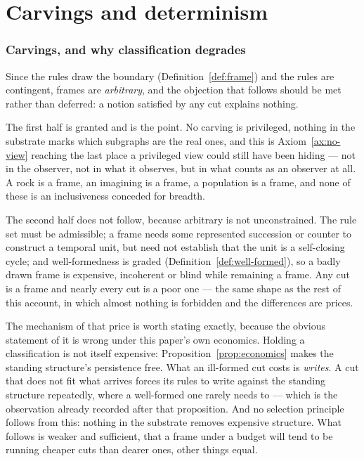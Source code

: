 \documentclass[11pt,a4paper]{article}
\theoremstyle{remark}\newtheorem{remark}[definition]{Remark}
\begin{document}
\part{Carvings and determinism}
\section{Carvings, and why classification degrades}\label{sec:carvings}

Since the rules draw the boundary (Definition~\ref{def:frame}) and the rules are contingent, frames
are \emph{arbitrary}, and the objection that follows should be met rather than deferred: a notion
satisfied by any cut explains nothing.

The first half is granted and is the point. No carving is privileged, nothing in the substrate marks
which subgraphs are the real ones, and this is Axiom~\ref{ax:no-view} reaching the last place a privileged view
could still have been hiding --- not in the observer, not in what it observes, but in what counts as
an observer at all. A rock is a frame, an imagining is a frame, a population is a frame, and none of
these is an inclusiveness conceded for breadth.

The second half does not follow, because arbitrary is not unconstrained. The rule set must be
admissible; a frame needs some represented succession or counter to construct a temporal unit, but
need not establish that the unit is a self-closing cycle; and well-formedness is graded
(Definition~\ref{def:well-formed}), so a badly drawn frame is expensive, incoherent or blind while
remaining a frame. Any cut is a frame and nearly every
cut is a poor one --- the same shape as the rest of this account, in which almost nothing is
forbidden and the differences are prices.

The mechanism of that price is worth stating exactly, because the obvious statement of it is wrong
under this paper's own economics. Holding a classification is not itself expensive:
Proposition~\ref{prop:economics} makes the standing structure's persistence free. What an ill-formed
cut costs is \emph{writes}. A cut that does not fit what arrives forces its rules to write against
the standing structure repeatedly, where a well-formed one rarely needs to --- which is the
observation already recorded after that proposition. And no selection principle follows from this:
nothing in the substrate removes expensive structure. What follows is weaker and sufficient, that a
frame under a budget will tend to be running cheaper cuts than dearer ones, other things equal.
\end{document}
